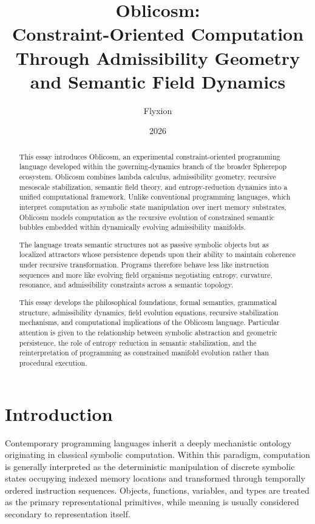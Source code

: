 \documentclass[11pt]{article}
\title{Oblicosm:\\
Constraint-Oriented Computation Through Admissibility Geometry and Semantic Field Dynamics}
\author{Flyxion}
\date{2026}
\begin{document}
\maketitle

\begin{abstract}

This essay introduces Oblicosm, an experimental constraint-oriented programming language developed within the governing-dynamics branch of the broader Spherepop ecosystem. Oblicosm combines lambda calculus, admissibility geometry, recursive mesoscale stabilization, semantic field theory, and entropy-reduction dynamics into a unified computational framework. Unlike conventional programming languages, which interpret computation as symbolic state manipulation over inert memory substrates, Oblicosm models computation as the recursive evolution of constrained semantic bubbles embedded within dynamically evolving admissibility manifolds.

The language treats semantic structures not as passive symbolic objects but as localized attractors whose persistence depends upon their ability to maintain coherence under recursive transformation. Programs therefore behave less like instruction sequences and more like evolving field organisms negotiating entropy, curvature, resonance, and admissibility constraints across a semantic topology.

This essay develops the philosophical foundations, formal semantics, grammatical structure, admissibility dynamics, field evolution equations, recursive stabilization mechanisms, and computational implications of the Oblicosm language. Particular attention is given to the relationship between symbolic abstraction and geometric persistence, the role of entropy reduction in semantic stabilization, and the reinterpretation of programming as constrained manifold evolution rather than procedural execution.

\end{abstract}

\section{Introduction}

Contemporary programming languages inherit a deeply mechanistic ontology originating in classical symbolic computation. Within this paradigm, computation is generally interpreted as the deterministic manipulation of discrete symbolic states occupying indexed memory locations and transformed through temporally ordered instruction sequences. Objects, functions, variables, and types are treated as the primary representational primitives, while meaning is usually considered secondary to representation itself.
\end{document}
